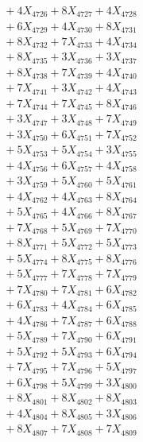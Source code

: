 \documentclass[a4paper,10pt]{article}
\begin{document}
{\begin{align}
&\;  + 4 X_{4726} + 8 X_{4727} + 4 X_{4728} \\[0.3ex]
&\;  + 6 X_{4729} + 4 X_{4730} + 8 X_{4731} \\[0.3ex]
&\;  + 8 X_{4732} + 7 X_{4733} + 4 X_{4734} \\[0.3ex]
&\;  + 8 X_{4735} + 3 X_{4736} + 3 X_{4737} \\[0.3ex]
&\;  + 8 X_{4738} + 7 X_{4739} + 4 X_{4740} \\[0.3ex]
&\;  + 7 X_{4741} + 3 X_{4742} + 4 X_{4743} \\[0.3ex]
&\;  + 7 X_{4744} + 7 X_{4745} + 8 X_{4746} \\[0.3ex]
&\;  + 3 X_{4747} + 3 X_{4748} + 7 X_{4749} \\[0.5ex]\allowbreak
&\;  + 3 X_{4750} + 6 X_{4751} + 7 X_{4752} \\[0.3ex]
&\;  + 5 X_{4753} + 5 X_{4754} + 3 X_{4755} \\[0.3ex]
&\;  + 4 X_{4756} + 6 X_{4757} + 4 X_{4758} \\[0.3ex]
&\;  + 3 X_{4759} + 5 X_{4760} + 5 X_{4761} \\[0.3ex]
&\;  + 4 X_{4762} + 4 X_{4763} + 8 X_{4764} \\[0.3ex]
&\;  + 5 X_{4765} + 4 X_{4766} + 8 X_{4767} \\[0.3ex]
&\;  + 7 X_{4768} + 5 X_{4769} + 7 X_{4770} \\[0.3ex]
&\;  + 8 X_{4771} + 5 X_{4772} + 5 X_{4773} \\[0.3ex]
&\;  + 5 X_{4774} + 8 X_{4775} + 8 X_{4776} \\[0.3ex]
&\;  + 5 X_{4777} + 7 X_{4778} + 7 X_{4779} \\[0.5ex]\allowbreak
&\;  + 7 X_{4780} + 7 X_{4781} + 6 X_{4782} \\[0.3ex]
&\;  + 6 X_{4783} + 4 X_{4784} + 6 X_{4785} \\[0.3ex]
&\;  + 4 X_{4786} + 7 X_{4787} + 6 X_{4788} \\[0.3ex]
&\;  + 5 X_{4789} + 7 X_{4790} + 6 X_{4791} \\[0.3ex]
&\;  + 5 X_{4792} + 5 X_{4793} + 6 X_{4794} \\[0.3ex]
&\;  + 7 X_{4795} + 7 X_{4796} + 5 X_{4797} \\[0.3ex]
&\;  + 6 X_{4798} + 5 X_{4799} + 3 X_{4800} \\[0.3ex]
&\;  + 8 X_{4801} + 8 X_{4802} + 8 X_{4803} \\[0.3ex]
&\;  + 4 X_{4804} + 8 X_{4805} + 3 X_{4806} \\[0.3ex]
&\;  + 8 X_{4807} + 7 X_{4808} + 7 X_{4809} \\[0.5ex]\allowbreak

\end{align}}
\end{document}
